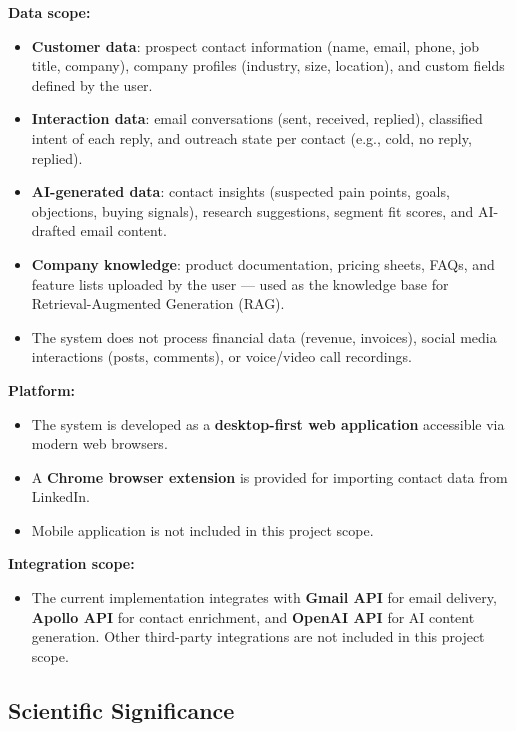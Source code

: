 \documentclass[a4paper]{article}
\begin{document}
\textbf{Data scope:}
\begin{itemize}
  \item \textbf{Customer data}: prospect contact information 
  (name, email, phone, job title, company), company profiles 
  (industry, size, location), and custom fields defined by 
  the user.

  \item \textbf{Interaction data}: email conversations 
  (sent, received, replied), classified intent of each reply, 
  and outreach state per contact (e.g., cold, no reply, replied).

  \item \textbf{AI-generated data}: contact insights (suspected 
  pain points, goals, objections, buying signals), research 
  suggestions, segment fit scores, and AI-drafted email content.

  \item \textbf{Company knowledge}: product documentation, pricing 
  sheets, FAQs, and feature lists uploaded by the user --- used 
  as the knowledge base for Retrieval-Augmented Generation (RAG).

  \item The system does not process financial data (revenue, 
  invoices), social media interactions (posts, comments), or 
  voice/video call recordings.
\end{itemize}

\textbf{Platform:}
\begin{itemize}
  \item The system is developed as a \textbf{desktop-first web 
  application} accessible via modern web browsers.
  \item A \textbf{Chrome browser extension} is provided for 
  importing contact data from LinkedIn.
  \item Mobile application is not included in this project scope.
\end{itemize}

\textbf{Integration scope:}
\begin{itemize}
\item The current implementation integrates with \textbf{Gmail API} 
for email delivery, \textbf{Apollo API} for contact enrichment, 
and \textbf{OpenAI API} for AI content generation. Other third-party 
integrations are not included in this project scope.

\end{itemize}
\subsection{Scientific Significance}
\end{document}
